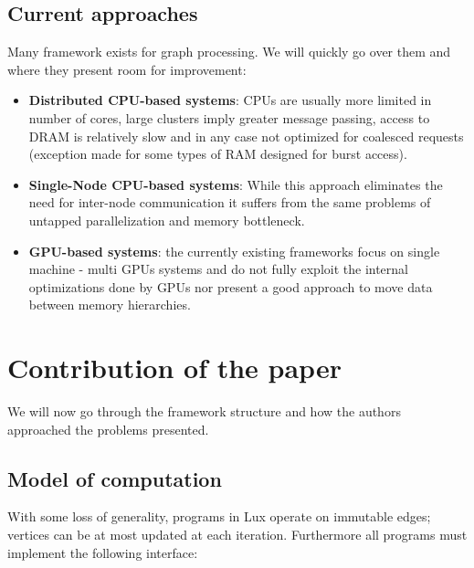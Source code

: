 \documentclass[]{article}
\begin{document}
\subsection{Current approaches}
Many framework exists for graph processing. We will quickly go over them and where they present room for improvement:
\begin{itemize}
	\item \textbf{Distributed CPU-based systems}: CPUs are usually more limited in number of cores, large clusters imply greater message passing, access to DRAM is relatively slow and in any case not optimized for coalesced requests (exception made for some types of RAM designed for burst access).
	\item \textbf{Single-Node CPU-based systems}: While this approach eliminates the need for inter-node communication it suffers from the same problems of untapped parallelization and memory bottleneck.
	\item \textbf{GPU-based systems}: the currently existing frameworks focus on single machine - multi GPUs systems and do not fully exploit the internal optimizations done by GPUs nor present a good approach to move data between memory hierarchies.
\end{itemize}
 
 \section{Contribution of the paper}
 We will now go through the framework structure and how the authors approached the problems presented.
 \subsection{Model of computation}
 
With some loss of generality, programs in Lux operate on immutable edges; vertices can be at most updated at each iteration. Furthermore all programs must implement the following interface:
 
\end{document}
